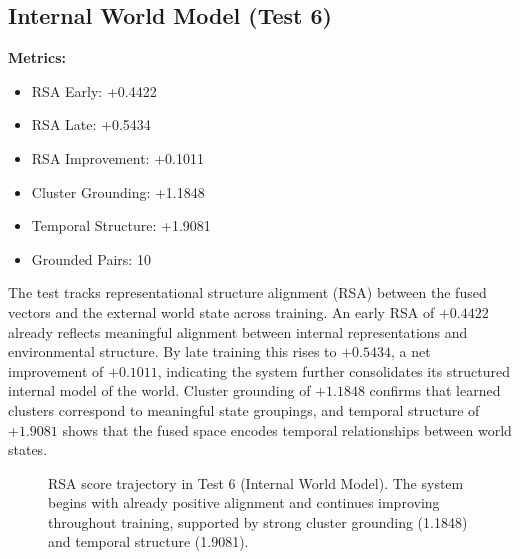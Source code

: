 \documentclass[12pt]{article}
\begin{document}
\subsection{Internal World Model (Test 6)}
\label{subsec:test6}

\textbf{Metrics:}
\begin{itemize}
    \item RSA Early: +0.4422
    \item RSA Late: +0.5434
    \item RSA Improvement: +0.1011
    \item Cluster Grounding: +1.1848
    \item Temporal Structure: +1.9081
    \item Grounded Pairs: 10
\end{itemize}

The test tracks representational structure alignment (RSA) between
the fused vectors and the external world state across training. An
early RSA of $+0.4422$ already reflects meaningful alignment between
internal representations and environmental structure. By late training
this rises to $+0.5434$, a net improvement of $+0.1011$, indicating
the system further consolidates its structured internal model of the
world. Cluster grounding of $+1.1848$ confirms that learned clusters
correspond to meaningful state groupings, and temporal structure of
$+1.9081$ shows that the fused space encodes temporal relationships
between world states.

\begin{figure}[H]
\centering
{}
\caption{RSA score trajectory in Test 6 (Internal World Model).
The system begins with already positive alignment and continues
improving throughout training, supported by strong cluster grounding
(1.1848) and temporal structure (1.9081).}
\label{fig:world_model}
\end{figure}
\end{document}
